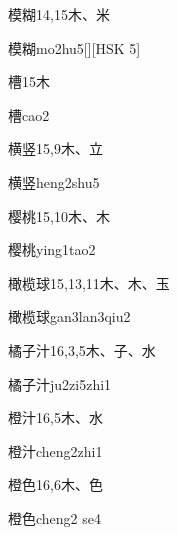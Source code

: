 \begin{entry}{模糊}{14,15}{⽊、⽶}
  \begin{phonetics}{模糊}{mo2hu5}[][HSK 5]
  \end{phonetics}
\end{entry}

\begin{entry}{槽}{15}{⽊}
  \begin{phonetics}{槽}{cao2}
  \end{phonetics}
\end{entry}

\begin{entry}{横竖}{15,9}{⽊、⽴}
  \begin{phonetics}{横竖}{heng2shu5}
  \end{phonetics}
\end{entry}

\begin{entry}{樱桃}{15,10}{⽊、⽊}
  \begin{phonetics}{樱桃}{ying1tao2}
  \end{phonetics}
\end{entry}

\begin{entry}{橄榄球}{15,13,11}{⽊、⽊、⽟}
  \begin{phonetics}{橄榄球}{gan3lan3qiu2}
  \end{phonetics}
\end{entry}

\begin{entry}{橘子汁}{16,3,5}{⽊、⼦、⽔}
  \begin{phonetics}{橘子汁}{ju2zi5zhi1}
  \end{phonetics}
\end{entry}

\begin{entry}{橙汁}{16,5}{⽊、⽔}
  \begin{phonetics}{橙汁}{cheng2zhi1}
  \end{phonetics}
\end{entry}

\begin{entry}{橙色}{16,6}{⽊、⾊}
  \begin{phonetics}{橙色}{cheng2 se4}
  \end{phonetics}
\end{entry}


